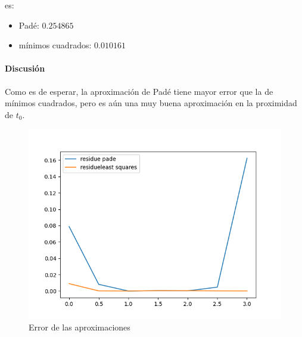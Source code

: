 es:
\begin{itemize}
	\item Padé: $0.254865$
	\item mínimos cuadrados: $0.010161$	
\end{itemize}

\paragraph{Discusión}

Como es de esperar, la aproximación de Padé tiene mayor error que la de mínimos cuadrados, pero es aún una muy buena aproximación en la proximidad de $t_0$.

\begin{figure}[H]
	\includegraphics[width=\linewidth]{figures/errores_quad_approx.png}
	\caption{Error de las aproximaciones}
	\label{fig:error_quad_approx}
\end{figure}